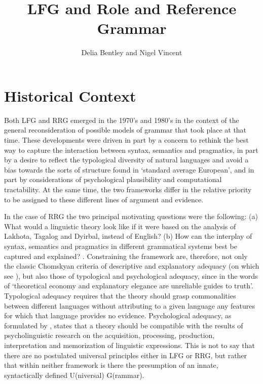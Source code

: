 \documentclass[output=paper,hidelinks]{langscibook}
\title{LFG and Role and Reference Grammar}
\author{Delia Bentley\affiliation{The University of Manchester}  and Nigel Vincent\affiliation{The University of Manchester}}
\begin{document}
\maketitle
\label{chap:RRG}

\section{Historical Context}
\label{sec:RRG:1}

Both LFG and RRG emerged in the 1970's and 1980's in the context of the general reconsideration of possible models of grammar that took place at that time. These developments were driven in part by a concern to rethink the best way to capture the interaction between syntax, semantics and pragmatics, in part by a desire to reflect the typological diversity of natural languages and avoid a bias towards the sorts of structure found in `standard average European', and in part by considerations of psychological plausibility and computational tractability. At the same time, the two frameworks differ in the relative priority to be assigned to these different lines of argument and evidence.

In the case of RRG the two principal motivating questions were the following: (a) What would a linguistic theory look like if it were based on the analysis of Lakhota, Tagalog and Dyirbal, instead of English? (b) How can the interplay of syntax, semantics and pragmatics in different grammatical systems best be captured and explained? \citep[704]{VanValin2010}. Constraining the framework are, therefore, not only the classic Chomskyan criteria of descriptive and explanatory adequacy (on which see \citealt{rizzi16}), but also those of typological and psychological adequacy, since in the words of \citet[263]{AustBres96} `theoretical economy and explanatory elegance are unreliable guides to truth'. Typological adequacy requires that the theory should grasp commonalities between different languages without attributing to a given language any features for which that language provides no evidence. Psychological adequacy, as formulated by \citet[248]{Dik1991}, states that a theory should be compatible with the results of psycholinguistic research on the acquisition, processing, production, interpretation and memorization of linguistic expressions. This is not to say that there are no postulated universal principles either in LFG or RRG, but rather that within neither framework is there the presumption of an innate, syntactically defined U(niversal) G(rammar).
\end{document}
